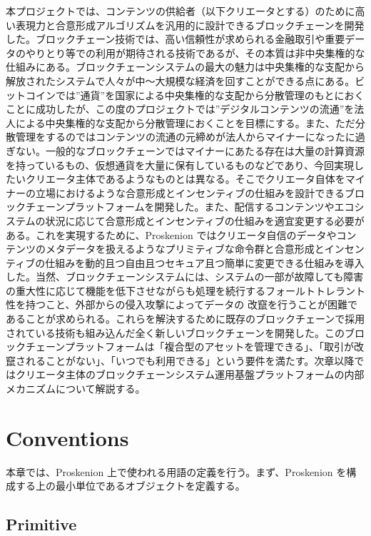 本プロジェクトでは、コンテンツの供給者（以下クリエータとする）のために高い表現力と合意形成アルゴリズムを汎用的に設計できるブロックチェーンを開発した。ブロックチェーン技術では、高い信頼性が求められる金融取引や重要データのやりとり等での利用が期待される技術であるが、その本質は非中央集権的な仕組みにある。ブロックチェーンシステムの最大の魅力は中央集権的な支配から解放されたシステムで人々が中〜大規模な経済を回すことができる点にある。ビットコインでは''通貨''を国家による中央集権的な支配から分散管理のもとにおくことに成功したが、この度のプロジェクトでは''デジタルコンテンツの流通''を法人による中央集権的な支配から分散管理におくことを目標にする。また、ただ分散管理をするのではコンテンツの流通の元締めが法人からマイナーになったに過ぎない。一般的なブロックチェーンではマイナーにあたる存在は大量の計算資源を持っているもの、仮想通貨を大量に保有しているものなどであり、今回実現したいクリエータ主体であるようなものとは異なる。そこでクリエータ自体をマイナーの立場におけるような合意形成とインセンティブの仕組みを設計できるブロックチェーンプラットフォームを開発した。また、配信するコンテンツやエコシステムの状況に応じて合意形成とインセンティブの仕組みを適宜変更する必要がある。これを実現するために、Proskenion
ではクリエータ自信のデータやコンテンツのメタデータを扱えるようなプリミティブな命令群と合意形成とインセンティブの仕組みを動的且つ自由且つセキュア且つ簡単に変更できる仕組みを導入した。当然、ブロックチェーンシステムには、システムの一部が故障しても障害の重大性に応じて機能を低下させながらも処理を続行するフォールトトレラント性を持つこと、外部からの侵入攻撃によってデータの
改竄を行うことが困難であることが求められる。これらを解決するために既存のブロックチェーンで採用されている技術も組み込んだ全く新しいブロックチェーンを開発した。このブロックチェーンプラットフォームは「複合型のアセットを管理できる」、「取引が改竄されることがない」、「いつでも利用できる」という要件を満たす。次章以降ではクリエータ主体のブロックチェーンシステム運用基盤プラットフォームの内部メカニズムについて解説する。

\hypertarget{conventions}{%
\section{Conventions}\label{conventions}}

本章では、Proskenion 上で使われる用語の定義を行う。まず、Proskenion
を構成する上の最小単位であるオブジェクトを定義する。

\hypertarget{primitive}{%
\subsection{Primitive}\label{primitive}}

